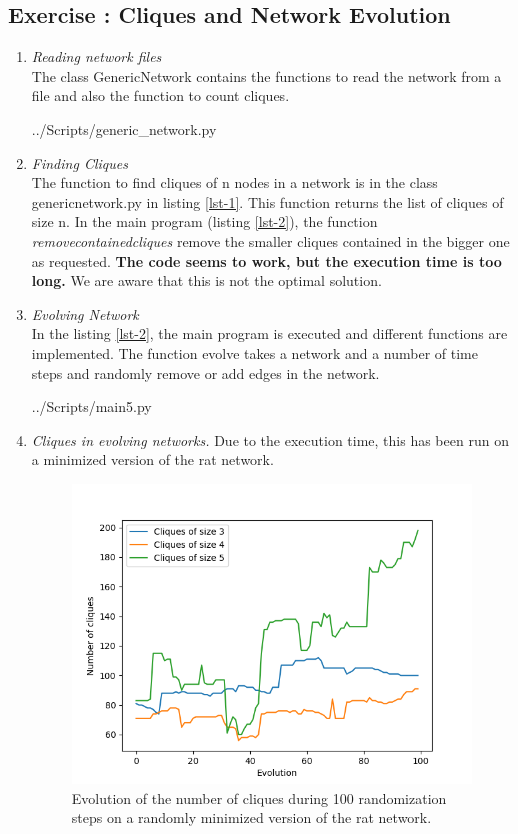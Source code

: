 \documentclass[10pt,a4paper]{article}
\newcommand{\exercise}[1]
{
  \stepcounter{subsection}
  \subsection*{Exercise \thesubsection: #1}

}
\begin{document}
\exercise{Cliques and Network Evolution}
\begin{enumerate}

\item \textit{Reading network files}\\ 
The class GenericNetwork contains the functions to read the network from a file and also the function to count cliques.

 {../Scripts/generic\string_network.py}



\newpage
\item \textit{Finding Cliques}\\

The function to find cliques of n nodes in a network is in the class generic\textunderscore network.py in listing \ref{lst-1}. This function returns the list of cliques of size n. In the main program (listing \ref{lst-2}), the function \textit{remove\textunderscore contained\textunderscore cliques} remove the smaller cliques contained in the bigger one as requested. \textbf{The code seems to work, but the execution time is too long.} We are aware that this is not the optimal solution. 




\item \textit{Evolving Network}\\

In the listing \ref{lst-2}, the main program is executed and different functions are implemented. The function evolve takes a network and a number of time steps and randomly remove or add edges in the network. 

 {../Scripts/main5.py}



\newpage
\item \textit{Cliques in evolving networks.}
Due to the execution time, this has been run on a minimized version of the rat network.

\begin{figure}[H]
	\centering
	\includegraphics[width=0.7\linewidth]{img/100randomMiniRat}
	\caption{Evolution of the number of cliques during 100 randomization steps on a randomly minimized version of the rat network. }
	\label{fig:100randomminirat}
\end{figure}




\end{enumerate}
\end{document}
